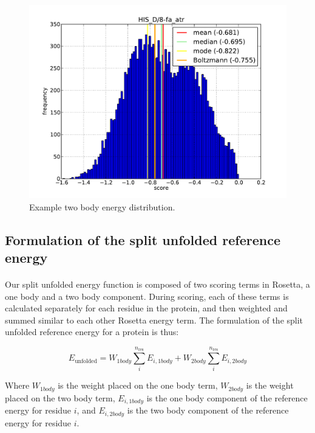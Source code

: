 \begin{figure}
  \includegraphics[width=\linewidth]{Figures/test.png}
  \caption{Example two body energy distribution.}
  \label{fig:tbaedist}
\end{figure}


\subsection{Formulation of the split unfolded reference energy}
\paragraph{}
Our split unfolded energy function is composed of two scoring terms in Rosetta, a one body and a two body component. During scoring, each of these terms is calculated separately for each residue in the protein, and then weighted and summed similar to each other Rosetta energy term. The formulation of the split unfolded reference energy for a protein is thus:

\begin{equation}
E_{\text{unfolded}} =  W_{1body} \sum_{i}^{n_{\text{res}}} E_{i,1body} +  W_{2body} \sum_{i}^{n_{\text{res}}} E_{i,2body}
\end{equation}

Where $W_{1body}$ is the weight placed on the one body term, $W_{2body}$ is the weight placed on the two body term, $E_{i,1body}$ is the one body component of the reference energy for residue $i$, and $E_{i,2body}$ is the two body component of the reference energy for residue $i$.

